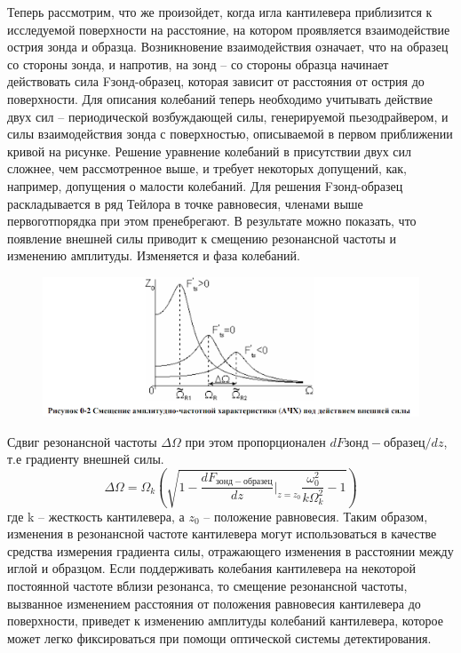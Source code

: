 \documentclass[a4paper,12pt]{article}
\theoremstyle{plain} %
\theoremstyle{definition} %
\theoremstyle{remark} %
\begin{document}
\begin{itemize}
Теперь рассмотрим, что же произойдет, когда игла кантилевера приблизится к исследуемой поверхности на расстояние, на котором проявляется взаимодействие острия зонда и образца. Возникновение взаимодействия означает, что на образец со стороны зонда, и напротив, на зонд – со стороны образца начинает действовать сила Fзонд-образец, которая зависит от расстояния от острия до поверхности. Для описания колебаний теперь необходимо учитывать действие двух сил – периодической возбуждающей силы,  генерируемой пьезодрайвером, и силы взаимодействия зонда с поверхностью,  описываемой в первом приближении кривой на рисунке. Решение уравнение колебаний в присутствии двух сил сложнее, чем рассмотренное выше, и требует некоторых допущений, как, например, допущения о малости колебаний. Для решения Fзонд-образец раскладывается в ряд Тейлора в точке равновесия, членами выше первоготпорядка при этом пренебрегают. В результате можно показать, что появление внешней силы приводит к смещению резонансной частоты и изменению амплитуды. Изменяется и фаза колебаний.
\begin{figure}[H]
	\centering
	\includegraphics[scale=1]{pic11.png}
	\label{pic11}
\end{figure}
Сдвиг резонансной частоты $ \Delta\Omega $ при этом пропорционален $ dF{зонд-образец}/dz $, т.е градиенту внешней силы.
\begin{equation}\label{key}
	\Delta\Omega=\Omega_k\left( \sqrt{1-\frac{dF_{зонд-образец}}{dz}\bigg|_{z=z_0}\frac{\omega_0^2}{k\Omega^2_k}-1}\right) 
\end{equation}
где k – жесткость кантилевера, а $ z_0 $ – положение равновесия. Таким образом, изменения в резонансной частоте кантилевера могут использоваться в качестве средства измерения градиента силы, отражающего изменения в расстоянии между иглой и образцом. Если поддерживать колебания кантилевера на некоторой постоянной частоте вблизи резонанса, то смещение резонансной частоты, вызванное изменением расстояния от положения равновесия кантилевера до поверхности, приведет к изменению амплитуды колебаний кантилевера, которое может легко фиксироваться при помощи оптической системы детектирования. 

\end{itemize}
\end{document}
